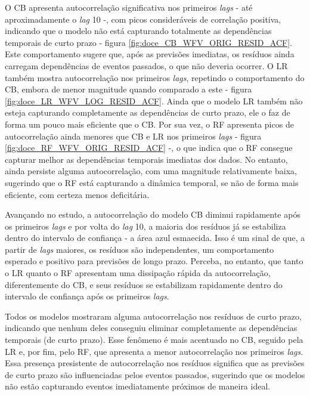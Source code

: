 O CB apresenta autocorrelação significativa nos primeiros \textit{lags} - até aproximadamente o \textit{lag} 10 -, com picos consideráveis de correlação positiva, indicando que o modelo não está capturando totalmente as dependências temporais de curto prazo - figura \ref{fig:doce_CB_WFV_ORIG_RESID_ACF}. Este comportamento sugere que, após as previsões imediatas, os resíduos ainda carregam dependências de eventos passados, o que não deveria ocorrer. O LR também mostra autocorrelação nos primeiros \textit{lags}, repetindo o comportamento do CB, embora de menor magnitude quando comparado a este - figura \ref{fig:doce_LR_WFV_LOG_RESID_ACF}. Ainda que o modelo LR também não esteja capturando completamente as dependências de curto prazo, ele o faz de forma um pouco mais eficiente que o CB. Por sua vez, o RF apresenta picos de autocorrelação ainda menores que CB e LR nos primeiros \textit{lags} - figura \ref{fig:doce_RF_WFV_ORIG_RESID_ACF} -, o que indica que o RF consegue capturar melhor as dependências temporais imediatas dos dados. No entanto, ainda persiste alguma autocorrelação, com uma magnitude relativamente baixa, sugerindo que o RF está capturando a dinâmica temporal, se não de forma mais eficiente, com certeza menos deficitária.

Avançando no estudo, a autocorrelação do modelo CB diminui rapidamente após os primeiros \textit{lags} e por volta do \textit{lag} 10, a maioria dos resíduos já se estabiliza dentro do intervalo de confiança - a área azul esmaecida. Isso é um sinal de que, a partir de \textit{lags} maiores, os resíduos são independentes, um comportamento esperado e positivo para previsões de longo prazo. Perceba, no entanto, que tanto o LR quanto o RF apresentam uma dissipação rápida da autocorrelação, diferentemente do CB, e seus resíduos se estabilizam rapidamente dentro do intervalo de confiança após os primeiros \textit{lags}.

Todos os modelos mostraram alguma autocorrelação nos resíduos de curto prazo, indicando que nenhum deles conseguiu eliminar completamente as dependências temporais (de curto prazo). Esse fenômeno é mais acentuado no CB, seguido pela LR e, por fim, pelo RF, que apresenta a menor autocorrelação nos primeiros \textit{lags}. Essa presença presistente de autocorrelação nos resíduos significa que as previsões de curto prazo são influenciadas pelos eventos passados, sugerindo que os modelos não estão capturando eventos imediatamente próximos de maneira ideal.

